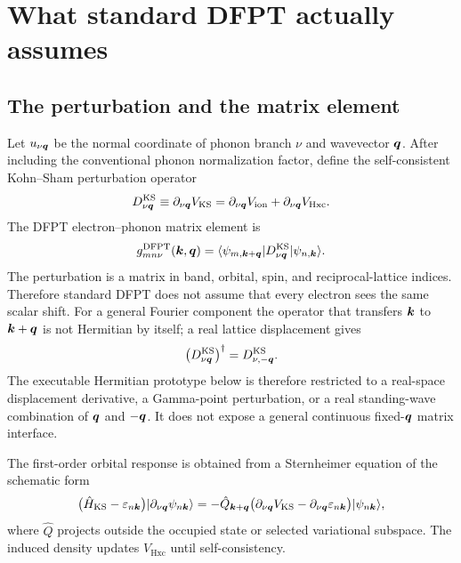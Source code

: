 \section{What standard DFPT actually assumes}
\label{sec:dfpt}

\subsection{The perturbation and the matrix element}

Let $u_{\nu\bm{q}}$ be the normal coordinate of phonon branch $\nu$ and wavevector
$\bm{q}$.  After including the conventional phonon normalization factor, define the
self-consistent Kohn--Sham perturbation operator
\begin{equation}
  D^{\mathrm{KS}}_{\nu\bm{q}}
  \equiv \partial_{\nu\bm{q}} V_{\mathrm{KS}}
  = \partial_{\nu\bm{q}} V_{\mathrm{ion}}
  + \partial_{\nu\bm{q}} V_{\mathrm{Hxc}} .
  \label{eq:dks}
\end{equation}
The DFPT electron--phonon matrix element is
\begin{equation}
  g^{\mathrm{DFPT}}_{mn\nu}(\bm{k},\bm{q})
  = \langle \psi_{m,\bm{k}+\bm{q}} |
    D^{\mathrm{KS}}_{\nu\bm{q}}
    | \psi_{n,\bm{k}} \rangle .
  \label{eq:gdfpt}
\end{equation}
The perturbation is a matrix in band, orbital, spin, and reciprocal-lattice
indices.  Therefore standard DFPT does not assume that every electron sees the
same scalar shift.  For a general Fourier component the operator that transfers
$\bm{k}$ to $\bm{k}+\bm{q}$ is not Hermitian by itself; a real lattice displacement gives
\begin{equation}
  \left(D^{\mathrm{KS}}_{\nu\bm{q}}\right)^\dagger
  =D^{\mathrm{KS}}_{\nu,-\bm{q}}.
  \label{eq:qpairhermiticity}
\end{equation}
The executable Hermitian prototype below is therefore restricted to a real-space
displacement derivative, a Gamma-point perturbation, or a real standing-wave
combination of $\bm{q}$ and $-\bm{q}$.  It does not expose a general continuous
fixed-$\bm{q}$ matrix interface.

The first-order orbital response is obtained from a Sternheimer equation of the
schematic form
\begin{equation}
  \bigl(\hat H_{\mathrm{KS}}-\varepsilon_{n\bm{k}}\bigr)
  |\partial_{\nu\bm{q}}\psi_{n\bm{k}}\rangle
  = -\hat Q_{\bm{k}+\bm{q}}
  \bigl(\partial_{\nu\bm{q}}V_{\mathrm{KS}}
  -\partial_{\nu\bm{q}}\varepsilon_{n\bm{k}}\bigr)
  |\psi_{n\bm{k}}\rangle,
  \label{eq:sternheimer}
\end{equation}
where $\hat Q$ projects outside the occupied state or selected variational
subspace.  The induced density updates $V_{\mathrm{Hxc}}$ until self-consistency.

